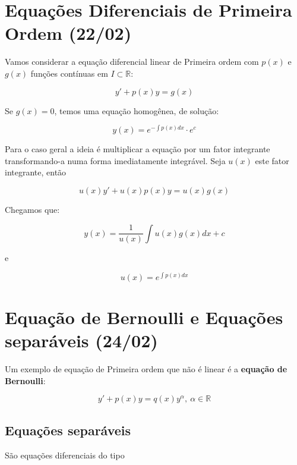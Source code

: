 \documentclass{article}
\begin{document}
\textbf{}
\vspace{4mm}

\textbf{}
\vspace{4mm}

\textbf{}
\vspace{4mm}

\textbf{}
\vspace{4mm}

\textbf{}
\vspace{4mm}

\textbf{}
\vspace{4mm}

\textbf{}
\vspace{4mm}

\textbf{}
\vspace{4mm}

\section*{Equações Diferenciais de Primeira Ordem (22/02)}
\label{s1}
Vamos considerar a equação diferencial linear de Primeira ordem com $p(x)$ e $g(x)$ funções contínuas em $I \subset \mathbb{R}$:

$$y' + p(x) y = g(x)$$

Se $g(x) = 0$, temos uma equação homogênea, de solução:

$$y(x) = e^{-\int p(x) d x} \cdot e^c$$

Para o caso geral a ideia é multiplicar a equação por um fator integrante transformando-a numa forma imediatamente integrável. Seja $u(x)$ este fator integrante, então

$$u(x) y' + u(x) p(x) y = u(x) g(x)$$

Chegamos que:

$$y(x) = \dfrac{1}{u(x)} \int u(x) g(x) d x + c$$

e

$$u(x) = e^{\int p(x) d x}$$

\section*{Equação de Bernoulli e Equações separáveis (24/02)}
\label{s2}
Um exemplo de equação de Primeira ordem que não é linear é a \textbf{equação de Bernoulli}:

$$y' + p(x) y = q(x) y^\alpha, \ \alpha \in \mathbb{R}$$

\subsection*{Equações separáveis}
São equações diferenciais do tipo
\end{document}
